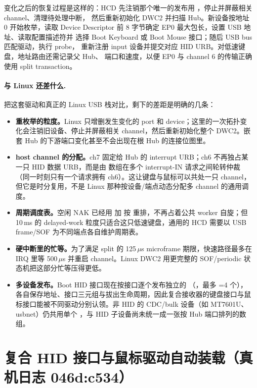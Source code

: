 变化之后的恢复过程是这样的：HCD 先注销那个唯一的发布用
，停止并屏蔽相关 channel、清理待处理中断，
然后重新初始化 DWC2 并扫描 Hub。新设备按地址 0 开始枚举，读取 Device
Descriptor 前 8 字节确定 EP0 最大包长，设置 USB 地址、读取配置描述符并
选择 Boot Keyboard 或 Boot Mouse 接口；随后 USB bus 匹配驱动，执行 probe，
重新注册 input 设备并提交对应 HID URB。对低速键盘，地址路由还需记录父 Hub、
端口和速度，以便 EP0 与 channel 6 的传输正确使用 split transaction。

\paragraph{与 Linux 还差什么.} 把这套驱动和真正的 Linux USB 栈对比，剩下的差距是明确的几条：

\begin{itemize}
  \item \textbf{重枚举的粒度。}Linux 只增删发生变化的 port 和 device；这里的一次拓扑变化会注销旧设备、停止并屏蔽相关 channel，然后重新初始化整个 DWC2。嵌套 Hub 的下游端口变化甚至不会出现在根 Hub 的连接位图里。
  \item \textbf{host channel 的分配。}ch7 固定给 Hub 的 interrupt URB；ch6 不再独占某一只 HID 数据 URB，而是由  数组在多个 interrupt-IN 请求之间轮转仲裁（同一时刻只有一个请求拥有 ch6）。这让键盘与鼠标可以共处一只 channel，但它是时分复用，不是 Linux 那种按设备/端点动态分配多 channel 的通用调度。
  \item \textbf{周期调度表。}空闲 NAK 已经用  加  按  重排，不再占着公共 worker 自旋；但 10\,ms 的 delayed-work 粒度只适合这只低速键盘，通用的 HCD 需要以 USB frame/SOF 为不同端点各自维护周期表。
  \item \textbf{硬中断里的忙等。}为了满足 split 的 125\,$\mu$s microframe 期限，快速路径最多在 IRQ 里等 500\,$\mu$s 并重启 channel。Linux DWC2 用更完整的 SOF/periodic 状态机把这部分忙等压得更低。
  \item \textbf{多设备发布。}Boot HID 接口现在按接口逐个发布独立的 （，最多 =4 个），各自保存地址、接口三元组与拔出生命周期，因此复合接收器的键盘接口与鼠标接口能被不同驱动分别认领。非 HID 的 CDC/bulk 设备（如 MT7601U、usbnet）仍共用单个 ，与 HID 子设备尚未统一成一张按 Hub 端口排列的数组。
\end{itemize}

\section{复合 HID 接口与鼠标驱动自动装载（真机日志 046d:c534）}
\label{sec:usb-mouse-autoload}

